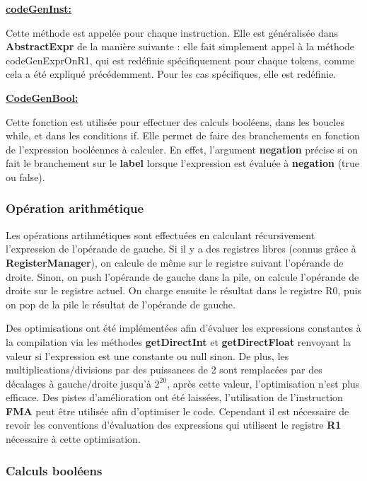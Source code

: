 \documentclass[12pt, a4paper, one side]{article}
\begin{document}
    \medskip
    \textbf{\underline{codeGenInst:}}

    Cette méthode est appelée pour chaque instruction. Elle est généralisée dans
    \textbf{AbstractExpr} de la manière suivante : elle fait simplement appel
    à la méthode codeGenExprOnR1, qui est redéfinie spécifiquement pour chaque
    tokens, comme cela a été expliqué précédemment. Pour les cas spécifiques,
    elle est redéfinie.

    \medskip
    \textbf{\underline{CodeGenBool:}}

    Cette fonction est utilisée pour effectuer des calculs booléens, dans les
    boucles while, et dans les conditions if. Elle permet de faire des
    branchements en fonction de l'expression booléennes à calculer. En effet, l'argument \textbf{negation} précise si
    on fait le branchement sur le \textbf{label} lorsque l'expression est évaluée à \textbf{negation} (true ou false).

    \subsubsection{Opération arithmétique}

    Les opérations artihmétiques sont effectuées en calculant récursivement
    l'expression de l'opérande de gauche. Si il y a des registres libres
    (connus grâce à \textbf{RegisterManager}), on calcule de même sur le
    registre suivant l'opérande de droite. Sinon, on push l'opérande de gauche
    dans la pile, on calcule l'opérande de droite sur le registre actuel.
    On charge ensuite le résultat dans le registre R0, puis  on pop de la pile le résultat de l'opérande de gauche.

    Des optimisations ont été implémentées afin d'évaluer les expressions constantes
    à la compilation via les méthodes \textbf{getDirectInt} et \textbf{getDirectFloat}
    renvoyant la valeur si l'expression est une constante ou null sinon. De plus,
    les multiplications/divisions par des puissances de 2 sont remplacées par des décalages
    à gauche/droite jusqu'à $2^{20}$, après cette valeur, l'optimisation n'est plus efficace.
    Des pistes d'amélioration ont été laissées, l'utilisation de l'instruction \textbf{FMA} peut être
    utilisée afin d'optimiser le code. Cependant il est nécessaire de revoir les conventions d'évaluation
    des expressions qui utilisent le registre \textbf{R1} nécessaire à cette optimisation.

    \subsubsection{Calculs booléens}
\end{document}
